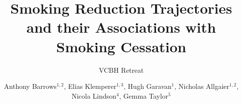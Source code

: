 \title{Smoking Reduction Trajectories and their Associations with Smoking Cessation}
\subtitle[]{VCBH Retreat}
\author[]{Anthony Barrows$^{1,2}$, Elias Klemperer$^{1,3}$, Hugh Garavan$^{1}$, Nicholas Allgaier$^{1,2}$, Nicola Lindson$^4$, Gemma Taylor$^5$}
\date{}

\makeatletter
\newcommand\insertlogoi[2][]{\def\@insertlogoi{\texttt{[image: \#2]}}}
\newcommand\insertlogoii[2][]{\def\@insertlogoii{\texttt{[image: \#2]}}}
\newlength\LogoSep
\setlength\LogoSep{0pt}
\makeatother